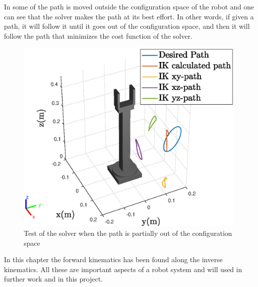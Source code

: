 In  some of the path is moved outside the configuration space of the robot and one can see that the solver makes the path at its best effort. In other words, if given a path, it will follow it until it goes out of the configuration space, and then it will follow the path that minimizes the cost function of the solver. 
\begin{figure}[htbp]
  \centering
  \includegraphics[width=.9\textwidth]{img/outOS.eps}
  \caption{Test of the solver when the path is partially out of the configuration space}
  \label{fig:outOC}
\end{figure}
In this chapter the forward kinematics has been found along the inverse kinematics. All these are important aspects of a robot system and will used in further work and in this project. 








































